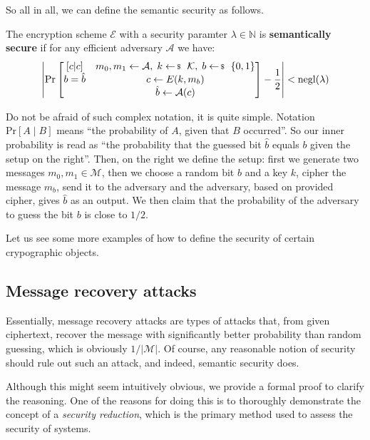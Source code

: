 \documentclass[../lecture-notes-148x210.tex]{subfiles}
\begin{document}
So all in all, we can define the semantic security as follows.

\begin{definition}
    The encryption scheme $\mathcal{E}$ with a security paramter $\lambda \in \mathbb{N}$ is \textbf{semantically secure} if for any efficient adversary $\mathcal{A}$ we have:
    \begin{equation*}
        \left|\text{Pr}\begin{bmatrix}[c|c]
            & m_0, m_1 \gets \mathcal{A}, \; k \leftarrowS \mathcal{K}, \; b \leftarrowS \{0,1\} \\
            b = \hat{b} & c \gets E(k,m_b) \\
            &\hat{b} \gets \mathcal{A}(c)
        \end{bmatrix} - \frac{1}{2}\right| < \text{negl}(\lambda)
    \end{equation*}
\end{definition}

Do not be afraid of such complex notation, it is quite simple. Notation $\text{Pr}[A \mid B]$ means ``the probability of $A$, given that $B$ occurred''. So our inner probability is read as ``the probability that the guessed bit $\hat{b}$ equals $b$ given the setup on the right''. Then, on the right we define the setup: first we generate two messages $m_0,m_1 \in \mathcal{M}$, then we choose a random bit $b$ and a key $k$, cipher the message $m_b$, send it to the adversary and the adversary, based on provided cipher, gives $\hat{b}$ as an output. We then claim that the probability of the adversary to guess the bit $b$ is close to $1/2$.

Let us see some more examples of how to define the security of certain crypographic objects.

\subsection{Message recovery attacks}

Essentially, message recovery attacks \cite[chapter 2]{Dan_Boneh_2023} are types of attacks that, from given ciphertext, recover the message with significantly better probability than random guessing, which is obviously $1/|\mathcal{M}|$.
Of course, any reasonable notion of security should rule out such an attack, and indeed, semantic security does.

Although this might seem intuitively obvious, we provide a formal proof to clarify the reasoning. 
One of the reasons for doing this is to thoroughly demonstrate the concept of a \emph{security reduction}, which is the primary method used to assess the security of systems.
\end{document}
